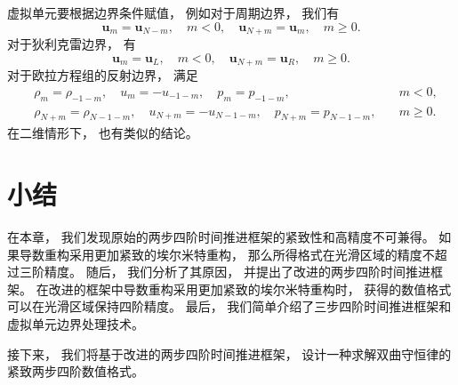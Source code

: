 虚拟单元要根据边界条件赋值，
例如对于周期边界，
我们有
\begin{equation}
  {\bm u}_{m} = {\bm u}_{N-m}, \quad m<0, \quad
  {\bm u}_{N+m} = {\bm u}_{m}, \quad m\ge 0.
\end{equation}
对于狄利克雷边界，
有
\begin{equation}
  {\bm u}_{m} = {\bm u}_L, \quad m<0, \quad
  {\bm u}_{N+m} = {\bm u}_R, \quad m\ge 0.
\end{equation}
对于欧拉方程组的反射边界，
满足
\begin{equation}
  \begin{aligned}
     & {\rho}_{m} = {\rho}_{-1-m}, \quad
    {u}_{m} = -{u}_{-1-m}, \quad
    {p}_{m} = {p}_{-1-m}, \quad
     & m<0,                                  \\
     & {\rho}_{N+m} = {\rho}_{N-1-m}, \quad
    {u}_{N+m} = -{u}_{N-1-m}, \quad
    {p}_{N+m} = {p}_{N-1-m}, \quad
     & m\ge 0.
  \end{aligned}
\end{equation}
在二维情形下，
也有类似的结论。

\section{小结}

在本章，
我们发现原始的两步四阶时间推进框架的紧致性和高精度不可兼得。
如果导数重构采用更加紧致的埃尔米特重构，
那么所得格式在光滑区域的精度不超过三阶精度。
随后，
我们分析了其原因，
并提出了改进的两步四阶时间推进框架。
在改进的框架中导数重构采用更加紧致的埃尔米特重构时，
获得的数值格式可以在光滑区域保持四阶精度。
最后，
我们简单介绍了三步四阶时间推进框架和虚拟单元边界处理技术。

接下来，
我们将基于改进的两步四阶时间推进框架，
设计一种求解双曲守恒律的紧致两步四阶数值格式。